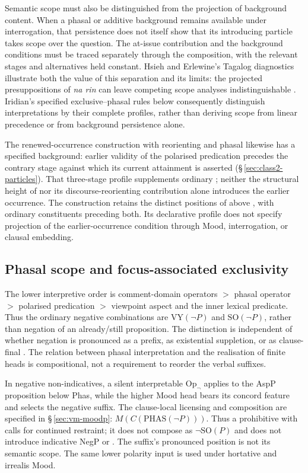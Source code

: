 Semantic scope must also be distinguished from the projection of background
content. When a phasal or additive background remains available under
interrogation, that persistence does not itself show that its introducing
particle takes scope over the question. The at-issue contribution and the
background conditions must be traced separately through the composition,
with the relevant stages and alternatives held constant. Hsieh and Erlewine's
Tagalog diagnostics illustrate both the value of this separation and its
limits: the projected presuppositions of \textit{na rin} can leave competing
scope analyses indistinguishable \cite[appendix~A]{hsieherlewine2024}.
Iridian's specified exclusive--phasal rules below consequently distinguish
interpretations by their complete profiles, rather than deriving scope from
linear precedence or from background persistence alone.

The renewed-occurrence construction with reorienting  and
phasal  likewise has a specified background: earlier validity of
the polarised predication precedes the contrary stage against which its
current attainment is asserted (§\,\ref{sec:class2-particles}). That
three-stage profile supplements ordinary ; neither the structural
height of  nor its discourse-reorienting contribution alone
introduces the earlier occurrence. The construction retains the
distinct positions of  above , with ordinary constituents
preceding both. Its declarative profile does
not specify projection of the earlier-occurrence condition through Mood,
interrogation, or clausal embedding.


\subsection{Phasal scope and focus-associated exclusivity}
\label{sec:th-exclusive-phasal}

The lower interpretive order is comment-domain operators $>$ phasal operator
$>$ polarised predication $>$ viewpoint aspect and the inner lexical predicate. Thus the
ordinary negative combinations are $\mathrm{VY}(\neg P)$ and
$\mathrm{SO}(\neg P)$, rather than negation of an already/still proposition.
The distinction is independent of whether negation is pronounced as a prefix,
as existential suppletion, or as clause-final . The relation between
phasal interpretation and the realisation of finite heads is compositional,
not a requirement to reorder the verbal suffixes.

In negative non-indicatives, a silent interpretable $\mathrm{Op}_{\neg}$
applies to the AspP proposition below Phas, while the higher Mood head bears
its concord feature and selects the negative suffix. The clause-local
licensing and composition are specified in §\,\ref{sec:vm-moodp}:
$M(C(\mathrm{PHAS}(\neg P)))$. Thus a prohibitive with  calls for
continued restraint; it does not compose as $\neg\mathrm{SO}(P)$ and does
not introduce indicative NegP or . The suffix's pronounced position
is not its semantic scope. The same lower polarity input is used under
hortative and irrealis Mood.

